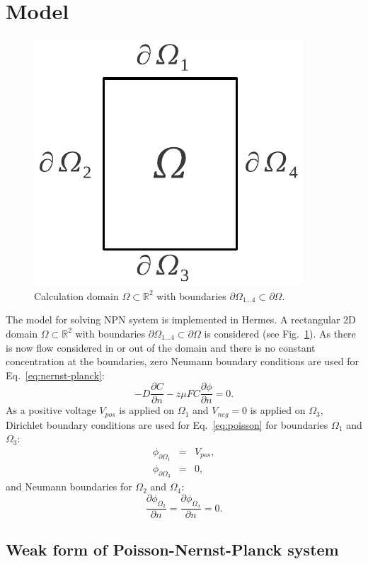 \section{Model}
\begin{figure}
  \begin{centering}
  \includegraphics[width=0.2\columnwidth]{domain}
  \caption{\label{fig:domain} Calculation domain $\Omega\subset\mathbb{R}^2$
  	with boundaries $\partial\Omega_{1\ldots 4}\subset\partial\Omega$.}
  \end{centering}
\end{figure}

The model for solving NPN system is implemented in Hermes.
A rectangular 2D domain $\Omega\subset\mathbb{R}^2$ with boundaries 
$\partial\Omega_{1\ldots 4}\subset\partial\Omega$  is considered (see Fig.~\ref{fig:domain}). 
As there is now flow considered in or out of the domain and there is no
constant concentration at the boundaries, zero Neumann boundary conditions are used 
for Eq.~\eqref{eq:nernst-planck}:
\begin{equation}
  -D \frac{\partial C}{\partial n} - z \mu F C \frac{\partial \phi} {\partial n} = 0.
  \label{eq:nernst-planck-boundary}
\end{equation}
As a positive voltage $V_{pos}$ is applied on $\Omega_1$ and $V_{neg}=0$ is applied
on $\Omega_3$, Dirichlet boundary conditions are used for Eq.~\eqref{eq:poisson} for
boundaries $\Omega_1$ and $\Omega_3$:
\begin{eqnarray}
  \phi_{\partial\Omega_1}&=&V_{pos},\\
  \phi_{\partial\Omega_3}&=&0,
  \label{eq:dirichlet}
\end{eqnarray}
and Neumann boundaries for $\Omega_2$ and $\Omega_4$:
\begin{equation}
  \frac{\partial \phi_{\Omega_2}}{\partial n}=\frac{\partial \phi_{\Omega_4}}{\partial n}=0.
\end{equation}


\subsection{Weak form of Poisson-Nernst-Planck system}

